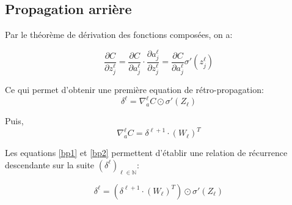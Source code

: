 \documentclass[10pt,a4paper,titlepage]{article}
\begin{document}
\subsection{Propagation arrière}
Par le théorème de dérivation des fonctions composées, on a:

\[\frac{\partial C}{\partial z_j^\ell}=\frac{\partial C}{\partial a_j^\ell} \cdot \frac{\partial a_j^\ell}{\partial z_j^\ell}=\frac{\partial C}{\partial a_j^\ell} \sigma'(z_j^\ell)\]

Ce qui permet d'obtenir une première equation de rétro-propagation:
\begin{equation}
\label{bp1}
\delta^\ell=\nabla_a^\ell C \odot \sigma'(Z_\ell)
\end{equation}

Puis,
\begin{equation}
\label{bp2}
\nabla_a^{\ell} C = \delta^{\ell+1} \cdot (W_\ell)^T 
\end{equation}

Les equations \eqref{bp1} et \eqref{bp2} permettent d'établir une relation de récurrence descendante sur la suite $(\delta^{\ell})_{\ell \in \mathbb{N}}$:

\begin{equation}
\delta^{\ell} = (\delta^{\ell+1} \cdot (W_\ell)^T) \odot \sigma'(Z_\ell)
\end{equation}
\end{document}
